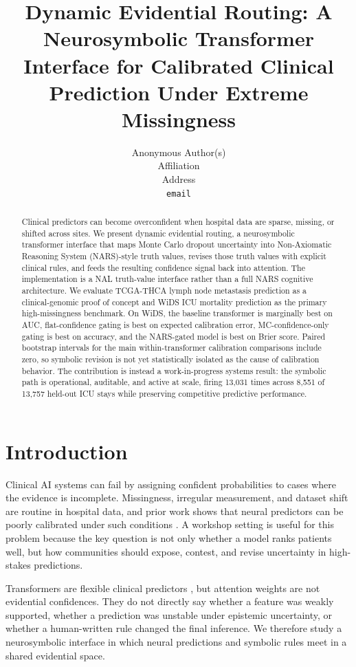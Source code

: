 \documentclass{article}
\title{Dynamic Evidential Routing: A Neurosymbolic Transformer Interface for Calibrated Clinical Prediction Under Extreme Missingness}
\author{%
  Anonymous Author(s)\\
  Affiliation\\
  Address\\
  \texttt{email}
}
\begin{document}
\maketitle


\begin{abstract}
Clinical predictors can become overconfident when hospital data are sparse, missing, or shifted across sites. We present dynamic evidential routing, a neurosymbolic transformer interface that maps Monte Carlo dropout uncertainty into Non-Axiomatic Reasoning System (NARS)-style truth values, revises those truth values with explicit clinical rules, and feeds the resulting confidence signal back into attention. The implementation is a NAL truth-value interface rather than a full NARS cognitive architecture. We evaluate TCGA-THCA lymph node metastasis prediction as a clinical-genomic proof of concept and WiDS ICU mortality prediction as the primary high-missingness benchmark. On WiDS, the baseline transformer is marginally best on AUC, flat-confidence gating is best on expected calibration error, MC-confidence-only gating is best on accuracy, and the NARS-gated model is best on Brier score. Paired bootstrap intervals for the main within-transformer calibration comparisons include zero, so symbolic revision is not yet statistically isolated as the cause of calibration behavior. The contribution is instead a work-in-progress systems result: the symbolic path is operational, auditable, and active at scale, firing 13,031 times across 8,551 of 13,757 held-out ICU stays while preserving competitive predictive performance.
\end{abstract}

\section{Introduction}
\label{sec:intro}

Clinical AI systems can fail by assigning confident probabilities to cases where the evidence is incomplete. Missingness, irregular measurement, and dataset shift are routine in hospital data, and prior work shows that neural predictors can be poorly calibrated under such conditions \citep{ma2019,ovadia2019,ghassemi2021}. A workshop setting is useful for this problem because the key question is not only whether a model ranks patients well, but how communities should expose, contest, and revise uncertainty in high-stakes predictions.

Transformers are flexible clinical predictors \citep{rasmy2021,azizi2021,li2019}, but attention weights are not evidential confidences. They do not directly say whether a feature was weakly supported, whether a prediction was unstable under epistemic uncertainty, or whether a human-written rule changed the final inference. We therefore study a neurosymbolic interface in which neural predictions and symbolic rules meet in a shared evidential space.
\end{document}
